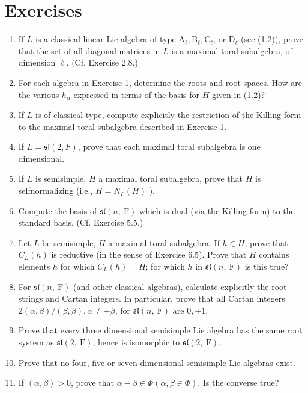 \documentclass[10pt]{article}
\begin{document}
\section*{Exercises}
\begin{enumerate}
  \item If $L$ is a classical linear Lie algebra of type $\mathrm{A}_{\ell}, \mathrm{B}_{\ell}, \mathrm{C}_{\ell}$, or $\mathrm{D}_{\ell}$ (see (1.2)), prove that the set of all diagonal matrices in $L$ is a maximal toral subalgebra, of dimension $\ell$. (Cf. Exercise 2.8.)
  \item For each algebra in Exercise 1, determine the roots and root spaces. How are the various $h_{\alpha}$ expressed in terms of the basis for $H$ given in (1.2)?
  \item If $L$ is of classical type, compute explicitly the restriction of the Killing form to the maximal toral subalgebra described in Exercise 1.
  \item If $L=\mathfrak{s l}(2, F)$, prove that each maximal toral subalgebra is one dimensional.
  \item If $L$ is semisimple, $H$ a maximal toral subalgebra, prove that $H$ is selfnormalizing (i.e., $H=N_{L}(H)$ ).
  \item Compute the basis of $\mathfrak{s l}(n, \mathrm{~F})$ which is dual (via the Killing form) to the standard basis. (Cf. Exercise 5.5.)
  \item Let $L$ be semisimple, $H$ a maximal toral subalgebra. If $h \in H$, prove that $C_{L}(h)$ is reductive (in the sense of Exercise 6.5). Prove that $H$ contains elements $h$ for which $C_{L}(h)=H$; for which $h$ in $\mathfrak{s l}(n, \mathrm{~F})$ is this true?
  \item For $\mathfrak{s l}(n, \mathrm{~F})$ (and other classical algebras), calculate explicitly the root strings and Cartan integers. In particular, prove that all Cartan integers $2(\alpha, \beta) /(\beta, \beta), \alpha \neq \pm \beta$, for $\mathfrak{s l}(n, \mathrm{~F})$ are $0, \pm 1$.
  \item Prove that every three dimensional semisimple Lie algebra has the same root system as $\mathfrak{s l}(2, \mathrm{~F})$, hence is isomorphic to $\mathfrak{s l}(2, \mathrm{~F})$.
  \item Prove that no four, five or seven dimensional semisimple Lie algebras exist.
  \item If $(\alpha, \beta)>0$, prove that $\alpha-\beta \in \Phi(\alpha, \beta \in \Phi)$. Is the converse true?
\end{enumerate}
\end{document}
